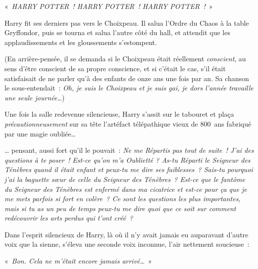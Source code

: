 «~\emph{HARRY POTTER~! HARRY POTTER~! HARRY POTTER~!}~»

Harry fit ses derniers pas vers le Choixpeau.
Il salua l'Ordre du Chaos à la table Gryffondor, puis se tourna et salua l'autre côté du hall, et attendit que les applaudissements et les gloussements s'estompent.

(En arrière-pensée, il se demanda si le Choixpeau était réellement \emph{conscient}, au sens d'être conscient de sa propre conscience, et si c'était le cas, s'il était satisfaisait de ne parler qu'à des enfants de onze ans une fois par an.
Sa chanson le sous-entendait~: \emph{Oh, je suis le Choixpeau et je suis gai, je dors l'année travaille une seule journée…})

Une fois la salle redevenue silencieuse, Harry s'assit sur le tabouret et plaça \emph{précautionneusement} sur sa tête l'artéfact télépathique vieux de 800~ans fabriqué par une magie oubliée…

… pensant, aussi fort qu'il le pouvait~:
\emph{Ne me Répartis pas tout de suite~! J'ai des questions à te poser~!
Est-ce qu'on m'a Oublietté ?
As-tu Réparti le Seigneur des Ténèbres quand il était enfant et peux-tu me dire ses faiblesses~?
Sais-tu pourquoi j'ai la baguette sœur de celle du Seigneur des Ténèbres~?
Est-ce que le fantôme du Seigneur des Ténèbres est enfermé dans ma cicatrice et est-ce pour ça que je me mets parfois si fort en colère~?
Ce sont les questions les plus importantes, mais si tu as un peu de temps peux-tu me dire quoi que ce soit sur comment redécouvrir les arts perdus qui t'ont créé~?}

Dans l'esprit silencieux de Harry, là où il n'y avait jamais eu auparavant d'autre voix que la sienne, s'éleva une seconde voix inconnue, l'air nettement soucieuse~:

«~\emph{Bon. Cela ne m'était encore jamais arrivé…}~»


